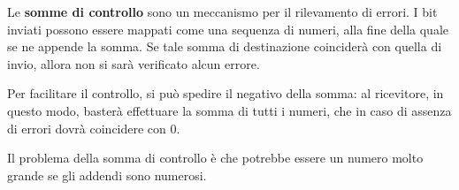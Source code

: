         Le \textbf{somme di controllo} sono un meccanismo per il rilevamento di errori. I bit inviati possono essere mappati come una sequenza di numeri, alla fine della quale se ne appende la somma. Se tale somma di destinazione coinciderà con quella di invio, allora non si sarà verificato alcun errore.
        
        Per facilitare il controllo, si può spedire il negativo della somma: al ricevitore, in questo modo, basterà effettuare la somma di tutti i numeri, che in caso di assenza di errori dovrà coincidere con 0.
        
        Il problema della somma di controllo è che potrebbe essere un numero molto grande se gli addendi sono numerosi.
                